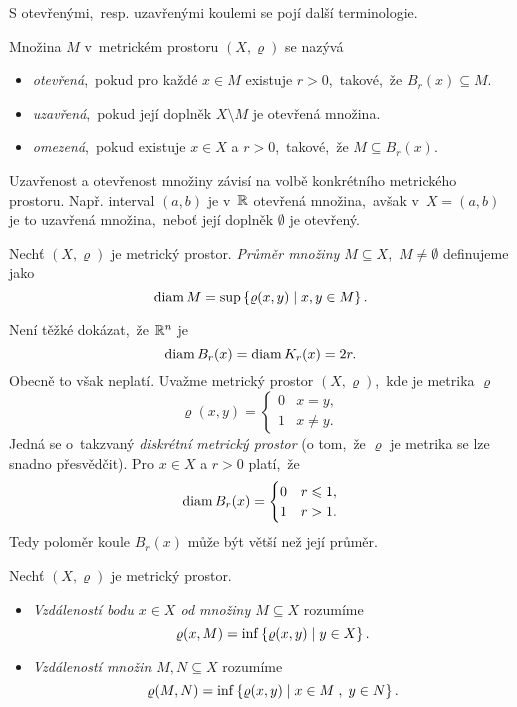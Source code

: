 S otevřenými,~resp. uzavřenými koulemi se pojí další terminologie.
\begin{definition}\label{def:otevrena-uzavrena-omezena-mnozina}
     Množina $M$ v~metrickém prostoru $(X,\varrho)$ se nazývá
     \begin{itemize}
        \item \emph{otevřená},~pokud pro každé $x\in M$ existuje $r>0$,~takové,~že $B_r(x)\subseteq M$.
        \item \emph{uzavřená},~pokud její doplněk $X\setminus M$ je otevřená množina.
        \item \emph{omezená},~pokud existuje $x\in X$ a $r>0$,~takové,~že $M\subseteq B_r(x)$.
     \end{itemize}
\end{definition}
Uzavřenost a otevřenost množiny závisí na volbě konkrétního metrického prostoru. Např. interval $(a,b)$ je v~$\mathbb{R}$ otevřená množina,~avšak v~$X=(a,b)$ je to uzavřená množina,~neboť její doplněk $\emptyset$ je otevřený.
\begin{definition}\label{def:prumer-mnoziny}
    Nechť $(X,\varrho)$ je metrický prostor. \emph{Průměr množiny $M\subseteq X$},~$M\neq\emptyset$ definujeme jako
    \[\operatorname{diam}{M}=\sup\left\{\varrho(x,y)\mid x,y\in M\right\}.\]
\end{definition}
Není těžké dokázat,~že $\mathbb{R}^n$ je
\[\operatorname{diam}{B_r(x)}=\operatorname{diam}{K_r(x)}=2r.\]
Obecně to však neplatí. Uvažme metrický prostor $(X,\varrho)$,~kde je metrika $\varrho$
\[\varrho(x,y)=\begin{cases}
    0 & x=y,\\
    1 & x\neq y.
\end{cases}\]
Jedná se o~takzvaný \emph{diskrétní metrický prostor} (o tom,~že $\varrho$ je metrika se lze snadno přesvědčit). Pro $x\in X$ a $r>0$ platí,~že
\[\operatorname{diam}{B_r(x)}=\begin{cases}
    0 & r\leqslant 1,\\
    1 & r>1.
\end{cases}\]
Tedy poloměr koule $B_r(x)$ může být větší než její průměr.

\begin{definition}\label{def:vzdalenost-bodu-od-mnoziny-vzdalenost-mnozin}
    Nechť $(X,\varrho)$ je metrický prostor.
    \begin{itemize}
        \item {}\emph{Vzdáleností bodu $x\in X$ od množiny $M\subseteq X$} rozumíme
        \[\varrho(x,M)=\inf\left\{\varrho(x,y)\mid y\in X\right\}.\]
        \item {}\emph{Vzdáleností množin $M,N\subseteq X$} rozumíme
        \[\varrho(M,N)=\inf\left\{\varrho(x,y)\mid x\in M\;,\;y\in N\right\}.\]
    \end{itemize}
\end{definition}

